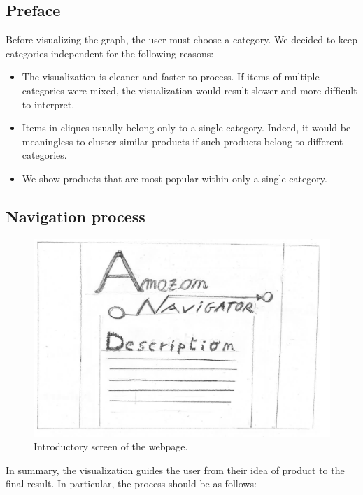 \documentclass[a4paper,12pt]{article}
\begin{document}
\subsection{Preface}
Before visualizing the graph, the user must choose a category.
We decided to keep categories independent for the following reasons:
\begin{itemize}
	\item The visualization is cleaner and faster to process. If items of multiple categories were mixed, the visualization would result slower and more difficult to interpret.
	\item Items in cliques usually belong only to a single category. Indeed, it would be meaningless to cluster similar products if such products belong to different categories.
	\item We show products that are most popular within only a single category.
\end{itemize}

\subsection{Navigation process}

\begin{figure}[H]
	\centering{}
	\includegraphics[width=\textwidth]{img/amazon.png}
	\caption{Introductory screen of the webpage.}
	\label{fig:amazon}
\end{figure}
In summary, the visualization guides the user from their idea of product to the final result. In particular, the process should be as follows:
\end{document}
